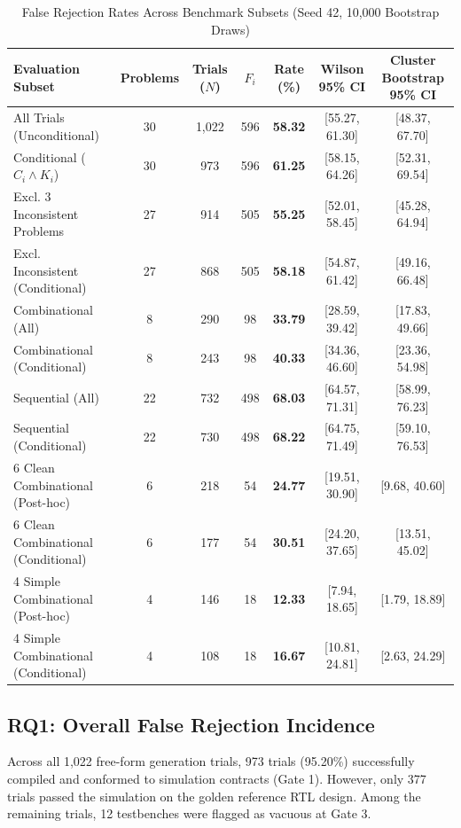 \documentclass[conference]{IEEEtran}
\begin{document}
\begin{table}[t]
\centering
\caption{False Rejection Rates Across Benchmark Subsets (Seed 42, 10,000 Bootstrap Draws)}
\label{tab:headline_rates}
\footnotesize
\setlength{\tabcolsep}{4pt}
\begin{tabular}{lcccccc}
\toprule
\textbf{Evaluation Subset} & \textbf{Problems} & \textbf{Trials ($N$)} & \textbf{$F_i$} & \textbf{Rate (\%)} & \textbf{Wilson 95\% CI} & \textbf{Cluster Bootstrap 95\% CI} \\
\midrule
All Trials (Unconditional) & 30 & 1,022 & 596 & \textbf{58.32} & [55.27, 61.30] & [48.37, 67.70] \\
Conditional ($C_i \land K_i$) & 30 & 973 & 596 & \textbf{61.25} & [58.15, 64.26] & [52.31, 69.54] \\
\midrule
Excl. 3 Inconsistent Problems & 27 & 914 & 505 & \textbf{55.25} & [52.01, 58.45] & [45.28, 64.94] \\
Excl. Inconsistent (Conditional) & 27 & 868 & 505 & \textbf{58.18} & [54.87, 61.42] & [49.16, 66.48] \\
\midrule
Combinational (All) & 8 & 290 & 98 & \textbf{33.79} & [28.59, 39.42] & [17.83, 49.66] \\
Combinational (Conditional) & 8 & 243 & 98 & \textbf{40.33} & [34.36, 46.60] & [23.36, 54.98] \\
Sequential (All) & 22 & 732 & 498 & \textbf{68.03} & [64.57, 71.31] & [58.99, 76.23] \\
Sequential (Conditional) & 22 & 730 & 498 & \textbf{68.22} & [64.75, 71.49] & [59.10, 76.53] \\
\midrule
6 Clean Combinational (Post-hoc) & 6 & 218 & 54 & \textbf{24.77} & [19.51, 30.90] & [9.68, 40.60] \\
6 Clean Combinational (Conditional) & 6 & 177 & 54 & \textbf{30.51} & [24.20, 37.65] & [13.51, 45.02] \\
4 Simple Combinational (Post-hoc) & 4 & 146 & 18 & \textbf{12.33} & [7.94, 18.65] & [1.79, 18.89] \\
4 Simple Combinational (Conditional) & 4 & 108 & 18 & \textbf{16.67} & [10.81, 24.81] & [2.63, 24.29] \\
\bottomrule
\end{tabular}
\end{table}

\subsection{RQ1: Overall False Rejection Incidence}
Across all 1,022 free-form generation trials, 973 trials (95.20\%) successfully compiled and conformed to simulation contracts (Gate 1). However, only 377 trials passed the simulation on the golden reference RTL design. Among the remaining trials, 12 testbenches were flagged as vacuous at Gate 3. 
\end{document}
